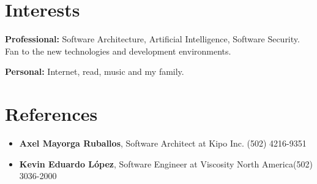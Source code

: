\documentclass[]{friggeri-cv} %
\begin{document}



\section{Interests}

\textbf{Professional:} Software Architecture, Artificial Intelligence, Software Security. Fan to the new technologies and development environments. 

\textbf{Personal:} Internet, read, music and my family.

\section{References}

\begin{itemize}
	\item \noindent \textbf{Axel Mayorga Ruballos},  Software Architect at Kipo Inc. \hfill \hfill (502) 4216-9351
	\item \noindent \textbf{Kevin Eduardo López}, Software Engineer at Viscosity North America\hfill \hfill (502) 3036-2000
\end{itemize}
\end{document}
